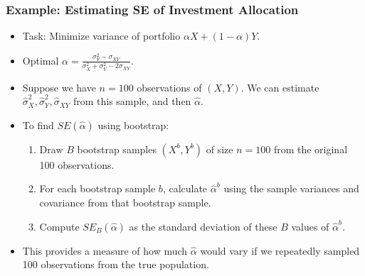 \documentclass[12pt,a4paper]{article}
\begin{document}
\begin{itemize}
\begin{itemize}
\begin{itemize}
    \subsubsection{Example: Estimating SE of Investment Allocation }
        \begin{itemize}
            \item Task: Minimize variance of portfolio $\alpha X + (1-\alpha)Y$.
            \item Optimal $\alpha = \frac{\sigma_Y^2 - \sigma_{XY}}{\sigma_X^2 + \sigma_Y^2 - 2\sigma_{XY}}$.
            \item Suppose we have $n=100$ observations of $(X,Y)$. We can estimate $\hat{\sigma}_X^2, \hat{\sigma}_Y^2, \hat{\sigma}_{XY}$ from this sample, and then $\hat{\alpha}$.
            \item To find $SE(\hat{\alpha})$ using bootstrap:
                \begin{enumerate}
                    \item Draw $B$ bootstrap samples $(X^{b}, Y^{b})$ of size $n=100$ from the original 100 observations.
                    \item For each bootstrap sample $b$, calculate $\hat{\alpha}^{b}$ using the sample variances and covariance from that bootstrap sample.
                    \item Compute $SE_B(\hat{\alpha})$ as the standard deviation of these $B$ values of $\hat{\alpha}^{b}$.
                \end{enumerate}
            \item This provides a measure of how much $\hat{\alpha}$ would vary if we repeatedly sampled 100 observations from the true population.
        \end{itemize}


\end{itemize}
\end{itemize}
\end{itemize}
\end{document}
